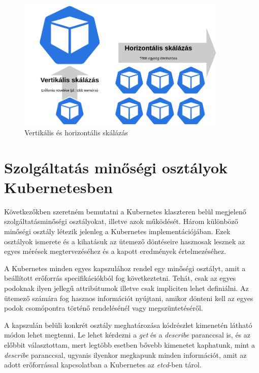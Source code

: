 \begin{figure}[!ht]
\centering
\includegraphics[width=100mm, keepaspectratio]{figures/scaling_types.png}
\caption{Vertikális és horizontális skálázás}
\label{fig:scaling}
\end{figure}


\section{Szolgáltatás minőségi osztályok Kubernetesben}

Következőkben szeretném bemutatni a Kubernetes klaszteren belül megjelenő szolgáltatásminőségi osztályokat, illetve azok működését.
Három különböző minőségi osztály létezik jelenleg a Kubernetes implementációjában\citep{KubernetesQoSClasses}. 
Ezek osztályok ismerete és a kihatásuk az ütemező döntéseire hasznosak lesznek az egyes mérések megtervezéséhez és a kapott eredmények értelmezéséhez.

A Kubernetes minden egyes kapszulához rendel egy minőségi osztályt, amit a beállított erőforrás specifikációkból fog következtetni.
Tehát, csak az egyes podoknak ilyen jellegű attribútumok illetve csak impliciten lehet definiálni.
Az ütemező számára fog hasznos információt nyújtani, amikor dönteni kell az egyes podok csomópontra történő rendelésénél vagy megszüntetéséről.

A kapszulán belüli konkrét osztály meghatározása  kódrészlet kimenetén látható módon lehet megtenni.
Le lehet kérdezni a \textit{get} és a \textit{describe} paranccsal is, és az előbbit választottam, mert legtöbb esetben bővebb kimenetet kaphatunk, mint a \textit{describe} paranccsal, ugyanis ilyenkor megkapunk minden információt, amit az adott erőforrással kapcsolatban a Kubernetes az \textit{etcd}-ben tárol.

